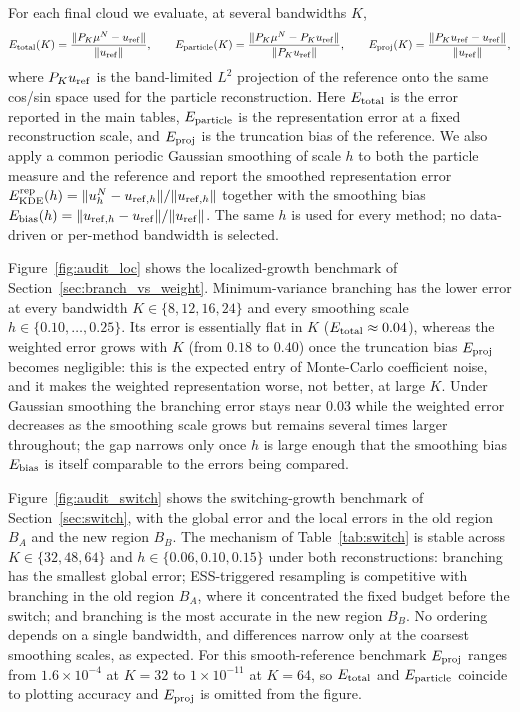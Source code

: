 \documentclass[a4paper,fleqn]{cas-sc}
\theoremstyle{definition}
\theoremstyle{remark}
\begin{document}
For each final cloud we evaluate, at several bandwidths $K$,
\begin{equation}
E_{\rm total}(K)=\frac{\|P_K\mu^N-u_{\rm ref}\|}{\|u_{\rm ref}\|},\qquad
E_{\rm particle}(K)=\frac{\|P_K\mu^N-P_Ku_{\rm ref}\|}{\|P_Ku_{\rm ref}\|},\qquad
E_{\rm proj}(K)=\frac{\|P_Ku_{\rm ref}-u_{\rm ref}\|}{\|u_{\rm ref}\|},
\label{equ:audit_fourier}
\end{equation}
where $P_K u_{\rm ref}$ is the band-limited $L^2$ projection of the reference onto
the same cos/sin space used for the particle reconstruction.  Here $E_{\rm total}$
is the error reported in the main tables, $E_{\rm particle}$ is the representation
error at a fixed reconstruction scale, and $E_{\rm proj}$ is the truncation bias of
the reference.  We also apply a common periodic Gaussian smoothing of scale $h$ to
both the particle measure and the reference and report the smoothed representation
error $E_{\rm KDE}^{\rm rep}(h)=\|u_h^N-u_{{\rm ref},h}\|/\|u_{{\rm ref},h}\|$
together with the smoothing bias
$E_{\rm bias}(h)=\|u_{{\rm ref},h}-u_{\rm ref}\|/\|u_{\rm ref}\|$.  The same $h$ is
used for every method; no data-driven or per-method bandwidth is selected.

Figure~\ref{fig:audit_loc} shows the localized-growth benchmark of
Section~\ref{sec:branch_vs_weight}.  Minimum-variance branching has the lower error
at every bandwidth $K\in\{8,12,16,24\}$ and every smoothing scale
$h\in\{0.10,\dots,0.25\}$.  Its error is essentially flat in $K$
($E_{\rm total}\approx0.04$), whereas the weighted error grows with $K$
(from $0.18$ to $0.40$) once the truncation bias $E_{\rm proj}$ becomes negligible:
this is the expected entry of Monte-Carlo coefficient noise, and it makes the
weighted representation worse, not better, at large $K$.  Under Gaussian smoothing
the branching error stays near $0.03$ while the weighted error decreases as the
smoothing scale grows but remains several times larger throughout; the gap narrows
only once $h$ is large enough that the smoothing bias $E_{\rm bias}$ is itself
comparable to the errors being compared.

Figure~\ref{fig:audit_switch} shows the switching-growth benchmark of
Section~\ref{sec:switch}, with the global error and the local errors in the old
region $B_A$ and the new region $B_B$.  The mechanism of Table~\ref{tab:switch} is
stable across $K\in\{32,48,64\}$ and $h\in\{0.06,0.10,0.15\}$ under both
reconstructions: branching has the smallest global error; ESS-triggered resampling
is competitive with branching in the old region $B_A$, where it concentrated the
fixed budget before the switch; and branching is the most accurate in the new
region $B_B$.  No ordering depends on a single bandwidth, and differences narrow
only at the coarsest smoothing scales, as expected.  For this smooth-reference
benchmark $E_{\rm proj}$ ranges from $1.6\times10^{-4}$ at $K=32$ to
$1\times10^{-11}$ at $K=64$, so $E_{\rm total}$ and $E_{\rm particle}$ coincide to
plotting accuracy and $E_{\rm proj}$ is omitted from the figure.
\end{document}
